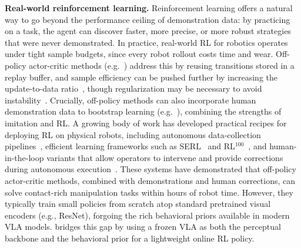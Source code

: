 \textbf{Real-world reinforcement learning.}
Reinforcement learning offers a natural way to go beyond the performance ceiling of demonstration data: by practicing on a task, the agent can discover faster, more precise, or more robust strategies that were never demonstrated.
In practice, real-world RL for robotics operates under tight sample budgets, since every robot rollout costs time and wear.
Off-policy actor-critic methods (e.g.~\cite{haarnoja2018soft,lillicrap2015continuous,fujimoto2018td3,Abdolmaleki2018MaximumAP}) address this by reusing transitions stored in a replay buffer, and sample efficiency can be pushed further by increasing the update-to-data ratio~\cite{hussing2024dissectingdeeprlhigh}, though regularization may be necessary to avoid instability~\cite{chen2021randomized}.
Crucially, off-policy methods can also incorporate human demonstration data to bootstrap learning (e.g.~\cite{ball2023efficient}), combining the strengths of imitation and RL.
A growing body of work has developed practical recipes for deploying RL on physical robots, including autonomous data-collection pipelines~\cite{zhu2020ingredients}, efficient learning frameworks such as SERL~\cite{luo2024serl,luo2024precise} and RL$^{100}$~\cite{rl100}, and human-in-the-loop variants that allow operators to intervene and provide corrections during autonomous execution~\cite{luo2024precise}.
These systems have demonstrated that off-policy actor-critic methods, combined with demonstrations and human corrections, can solve contact-rich manipulation tasks within hours of robot time.
However, they typically train small policies from scratch atop standard pretrained visual encoders (e.g., ResNet), forgoing the rich behavioral priors available in modern VLA models.
\MethodName{} bridges this gap by using a frozen VLA as both the perceptual backbone and the behavioral prior for a lightweight online RL policy.
 
